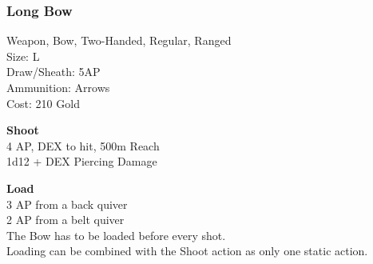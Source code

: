 \subsubsection{Long Bow}\label{weapon:longBow}
Weapon, Bow, Two-Handed, Regular, Ranged\\
Size: L\\
Draw/Sheath: 5AP\\
Ammunition: Arrows\\
Cost: 210 Gold

\textbf{Shoot}\\
4 AP, DEX to hit, 500m Reach\\
1d12 + \texttimes DEX Piercing Damage

\textbf{Load}\\
3 AP from a back quiver\\
2 AP from a belt quiver\\
The Bow has to be loaded before every shot.\\
Loading can be combined with the Shoot action as only one static action.